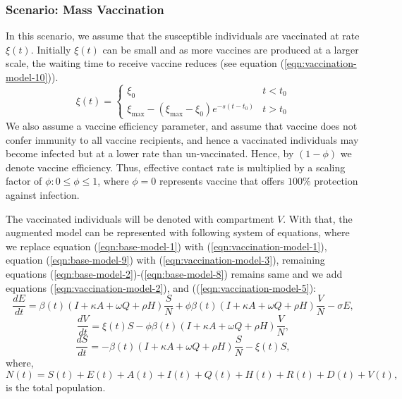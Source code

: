\documentclass[fleqn,10pt]{wlscirep}
\begin{document}
\subsubsection*{Scenario: Mass Vaccination }
In this scenario, we assume that the susceptible individuals are vaccinated at rate $\xi(t)$. Initially $\xi(t)$ can be small and as more vaccines are produced at a larger scale, the waiting time to receive vaccine reduces (see equation (\ref{eqn:vaccination-model-10})). 
%
%
\begin{equation}
 \xi(t) = 
\begin{cases}
\xi_0 & t < t_0 \\
\xi_{\max} - (\xi_{\max} - \xi_0) e^{-s \left( t-t_0\right) } & t > t_0
\end{cases}
\label{eqn:vaccination-model-10}
\end{equation}
%
%
We also assume a vaccine efficiency parameter, and assume that vaccine does not confer immunity to all vaccine recipients, and hence a vaccinated individuals may become infected but at a lower rate than un-vaccinated. Hence, by $(1-\phi)$ we denote vaccine efficiency. Thus, effective contact rate is multiplied by a scaling factor of $\phi : 0 \leq \phi \leq 1$, where $\phi = 0$ represents vaccine that offers $100\%$ protection against infection.

The vaccinated individuals will be denoted with compartment $V$. With that, the augmented model can be represented with following system of equations, where we replace equation (\ref{eqn:base-model-1}) with (\ref{eqn:vaccination-model-1}), equation (\ref{eqn:base-model-9}) with (\ref{eqn:vaccination-model-3}), remaining equations (\ref{eqn:base-model-2})-(\ref{eqn:base-model-8}) remains same and we add equations (\ref{eqn:vaccination-model-2}), and ((\ref{eqn:vaccination-model-5}):
%
%
\begin{equation}
\frac{dE}{dt} = \beta(t) \left( I + \kappa A + \omega Q + \rho H \right) \frac{S}{N} + \phi \beta(t) \left( I + \kappa A + \omega Q + \rho H \right) \frac{V}{N} - \sigma E, 
\label{eqn:vaccination-model-1}
\end{equation}
%
%
\begin{equation}
\frac{dV}{dt} =  \xi(t) S - \phi  \beta(t) \left( I + \kappa A + \omega Q + \rho H \right) \frac{V}{N},
\label{eqn:vaccination-model-2}
\end{equation}
\begin{equation}
\frac{dS}{dt} = -\beta(t) \left( I + \kappa A + \omega Q + \rho H \right) \frac{S}{N} - \xi(t) S,
\label{eqn:vaccination-model-3}
\end{equation}
%
%
where,
\begin{equation}
N(t) = S(t) + E(t) + A(t) + I(t) + Q(t) + H(t) + R(t) + D(t) + V(t),
\label{eqn:vaccination-model-5}
\end{equation}
is the total population. 
\end{document}
